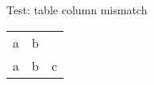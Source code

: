 \documentclass{article}
\begin{document}
Test: table column mismatch

\begin{tabular}{lll}
    a & b \\
    a & b & c \\
\end{tabular}
\end{document}
